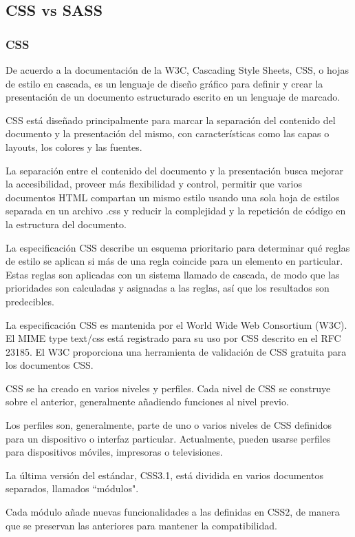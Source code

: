 \subsection{CSS vs SASS}
\subsubsection*{CSS}
De acuerdo a la documentación de la W3C\cite{noauthor_what_nodate}, Cascading Style Sheets, CSS, o hojas de estilo en cascada, es un lenguaje de diseño gráfico para definir y crear la presentación de un documento estructurado escrito en un lenguaje de marcado.


CSS está diseñado principalmente para marcar la separación del contenido del documento y la presentación del mismo, con características como las capas o layouts, los colores y las fuentes.


La separación entre el contenido del documento y la presentación busca mejorar la accesibilidad, proveer más flexibilidad y control, permitir que varios documentos HTML compartan un mismo estilo usando una sola hoja de estilos separada en un archivo .css y reducir la complejidad y la repetición de código en la estructura del documento.


La especificación CSS describe un esquema prioritario para determinar qué reglas de estilo se aplican si más de una regla coincide para un elemento en particular. Estas reglas son aplicadas con un sistema llamado de cascada, de modo que las prioridades son calculadas y asignadas a las reglas, así que los resultados son predecibles.


La especificación CSS es mantenida por el World Wide Web Consortium (W3C). El MIME type text/css está registrado para su uso por CSS descrito en el RFC 23185​. El W3C proporciona una herramienta de validación de CSS gratuita para los documentos CSS.



CSS se ha creado en varios niveles y perfiles. Cada nivel de CSS se construye sobre el anterior, generalmente añadiendo funciones al nivel previo.


Los perfiles son, generalmente, parte de uno o varios niveles de CSS definidos para un dispositivo o interfaz particular. Actualmente, pueden usarse perfiles para dispositivos móviles, impresoras o televisiones.


La última versión del estándar, CSS3.1, está dividida en varios documentos separados, llamados ``módulos".


Cada módulo añade nuevas funcionalidades a las definidas en CSS2, de manera que se preservan las anteriores para mantener la compatibilidad.


